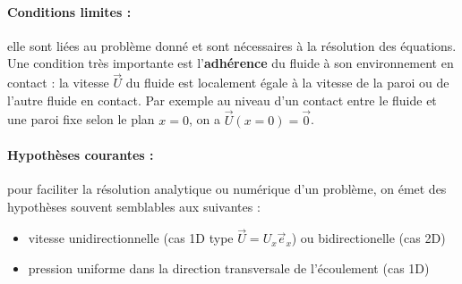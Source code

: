 \paragraph{Conditions limites :}elle sont liées au problème donné et sont nécessaires à la résolution des équations. Une condition très importante est l'\textbf{adhérence} du fluide à son environnement en contact : la vitesse $\vec{U}$ du fluide est localement égale à la vitesse de la paroi ou de l'autre fluide en contact. Par exemple au niveau d'un contact entre le fluide et une paroi fixe selon le plan $x = 0$, on a $\vec{U}(x=0) = \vec{0}$.

\paragraph{Hypothèses courantes :}pour faciliter la résolution analytique ou numérique d'un problème, on émet des hypothèses souvent semblables aux suivantes :
%
\begin{itemize}
\item vitesse unidirectionnelle (cas 1D type $\vec{U} = U_x \vec{e}_x$) ou bidirectionelle (cas 2D)
\item pression uniforme dans la direction transversale de l'écoulement (cas 1D)
\end{itemize}


